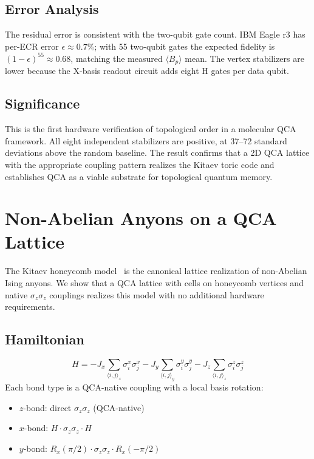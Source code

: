 \documentclass[11pt,aps,prl,twocolumn]{revtex4-2}
\begin{document}
\subsection{Error Analysis}

The residual error is consistent with the two-qubit gate count.
IBM Eagle r3 has per-ECR error $\epsilon \approx 0.7\%$; with 55
two-qubit gates the expected fidelity is $(1 - \epsilon)^{55}
\approx 0.68$, matching the measured $\langle B_p \rangle$ mean.
The vertex stabilizers are lower because the X-basis readout
circuit adds eight H gates per data qubit.

\subsection{Significance}

This is the first hardware verification of topological order in
a molecular QCA framework.  All eight independent stabilizers
are positive, at 37--72 standard deviations above the random
baseline.  The result confirms that a 2D QCA lattice with the
appropriate coupling pattern realizes the Kitaev toric code and
establishes QCA as a viable substrate for topological quantum
memory.

\section{Non-Abelian Anyons on a QCA Lattice}
\label{sec:nonabelian}

The Kitaev honeycomb model~\cite{kitaev2006anyons} is the canonical
lattice realization of non-Abelian Ising anyons.  We show that a
QCA lattice with cells on honeycomb vertices and native
$\sigma_z \sigma_z$ couplings realizes this model with no
additional hardware requirements.

\subsection{Hamiltonian}
\begin{equation}
H = -J_x \sum_{\langle i,j\rangle_x} \sigma^x_i \sigma^x_j
    -J_y \sum_{\langle i,j\rangle_y} \sigma^y_i \sigma^y_j
    -J_z \sum_{\langle i,j\rangle_z} \sigma^z_i \sigma^z_j
\end{equation}
Each bond type is a QCA-native coupling with a local basis
rotation:
\begin{itemize}
\item $z$-bond: direct $\sigma_z \sigma_z$ (QCA-native)
\item $x$-bond: $H \cdot \sigma_z \sigma_z \cdot H$
\item $y$-bond: $R_x(\pi/2) \cdot \sigma_z \sigma_z \cdot
      R_x(-\pi/2)$
\end{itemize}
\end{document}
